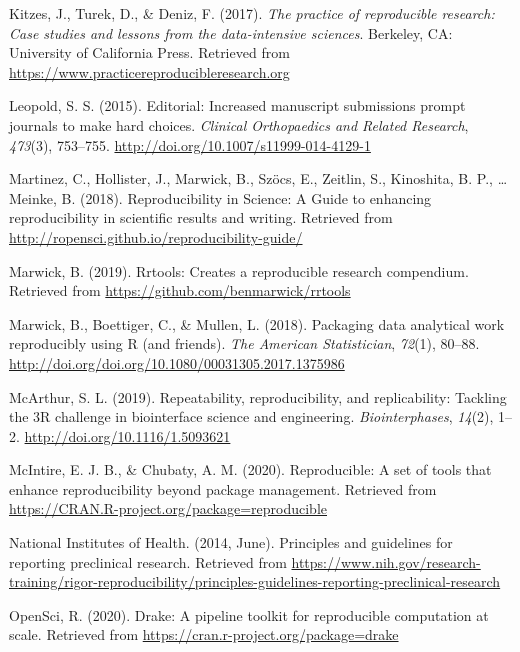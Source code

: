 \documentclass[12pt,twoside]{reedthesis}
\begin{document}
\hypertarget{ref-kitzes2017practice}{}
Kitzes, J., Turek, D., \& Deniz, F. (2017). \emph{The practice of
reproducible research: Case studies and lessons from the data-intensive
sciences}. Berkeley, CA: University of California Press. Retrieved from
\url{https://www.practicereproducibleresearch.org}

\hypertarget{ref-leopold2015increased}{}
Leopold, S. S. (2015). Editorial: Increased manuscript submissions
prompt journals to make hard choices. \emph{Clinical Orthopaedics and
Related Research}, \emph{473}(3), 753--755.
\url{http://doi.org/10.1007/s11999-014-4129-1}

\hypertarget{ref-r-opensci}{}
Martinez, C., Hollister, J., Marwick, B., Szöcs, E., Zeitlin, S.,
Kinoshita, B. P., \ldots{} Meinke, B. (2018). Reproducibility in
Science: A Guide to enhancing reproducibility in scientific results and
writing. Retrieved from
\url{http://ropensci.github.io/reproducibility-guide/}

\hypertarget{ref-R-rrtools}{}
Marwick, B. (2019). Rrtools: Creates a reproducible research compendium.
Retrieved from \url{https://github.com/benmarwick/rrtools}

\hypertarget{ref-marwick2018packaging}{}
Marwick, B., Boettiger, C., \& Mullen, L. (2018). Packaging data
analytical work reproducibly using R (and friends). \emph{The American
Statistician}, \emph{72}(1), 80--88.
\url{http://doi.org/doi.org/10.1080/00031305.2017.1375986}

\hypertarget{ref-engineering-reproducibility}{}
McArthur, S. L. (2019). Repeatability, reproducibility, and
replicability: Tackling the 3R challenge in biointerface science and
engineering. \emph{Biointerphases}, \emph{14}(2), 1--2.
\url{http://doi.org/10.1116/1.5093621}

\hypertarget{ref-R-reproducible}{}
McIntire, E. J. B., \& Chubaty, A. M. (2020). Reproducible: A set of
tools that enhance reproducibility beyond package management. Retrieved
from \url{https://CRAN.R-project.org/package=reproducible}

\hypertarget{ref-bio-principles}{}
National Institutes of Health. (2014, June). Principles and guidelines
for reporting preclinical research. Retrieved from
\url{https://www.nih.gov/research-training/rigor-reproducibility/principles-guidelines-reporting-preclinical-research}

\hypertarget{ref-R-drake}{}
OpenSci, R. (2020). Drake: A pipeline toolkit for reproducible
computation at scale. Retrieved from
\url{https://cran.r-project.org/package=drake}
\end{document}
